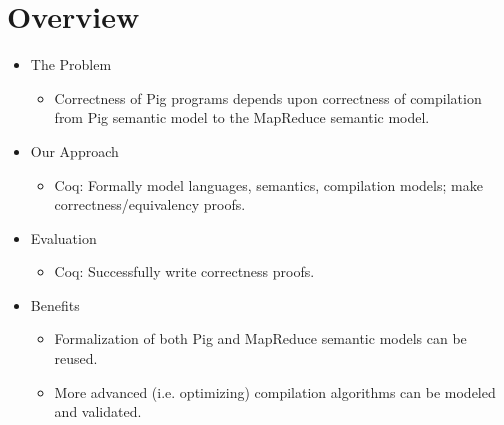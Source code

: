 \section*{Overview}

\begin{frame}
\begin{itemize}
  \item The Problem
  \begin{itemize}
    \item Correctness of Pig programs depends upon correctness of compilation
          from Pig semantic model to the MapReduce semantic model.
  \end{itemize}

  \item Our Approach
  \begin{itemize}
    \item Coq: Formally model languages, semantics, compilation models; make
          correctness/equivalency proofs.
  \end{itemize}

  \item Evaluation
  \begin{itemize}
    \item Coq: Successfully write correctness proofs.
  \end{itemize}

  \item Benefits
  \begin{itemize}
    \item Formalization of both Pig and MapReduce semantic models can be reused.
    \item More advanced (i.e. optimizing) compilation algorithms can be modeled
          and validated.
  \end{itemize}

\end{itemize}
\end{frame}
